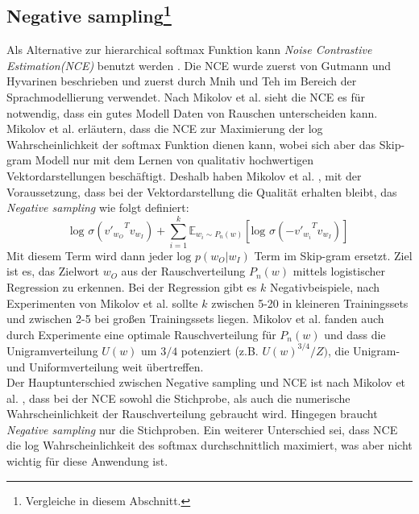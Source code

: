 \documentclass[12pt,a4paper]{report}
\begin{document}
\subsection*{Negative sampling\footnote{Vergleiche \cite{DBLP:journals/corr/MikolovSCCD13} in diesem Abschnitt.}}
Als Alternative zur hierarchical softmax Funktion kann \textit{Noise Contrastive Estimation(NCE)} benutzt werden \cite{DBLP:journals/corr/MikolovSCCD13}. Die NCE wurde zuerst von Gutmann und Hyvarinen \cite{gutmann2012noise} beschrieben und zuerst durch Mnih und Teh \cite{mnih2012fast} im Bereich der Sprachmodellierung verwendet. Nach Mikolov et al. \cite{DBLP:journals/corr/MikolovSCCD13} sieht die NCE es für notwendig, dass ein gutes Modell Daten von Rauschen unterscheiden kann. Mikolov et al. \cite{DBLP:journals/corr/MikolovSCCD13} erläutern, dass die NCE zur Maximierung der log Wahrscheinlichkeit der softmax Funktion dienen kann, wobei sich aber das Skip-gram Modell nur mit dem Lernen von qualitativ hochwertigen Vektordarstellungen beschäftigt. Deshalb haben Mikolov et al. \cite{DBLP:journals/corr/MikolovSCCD13}, mit der Voraussetzung, dass bei der Vektordarstellung die Qualität erhalten bleibt, das \textit{Negative sampling} wie folgt definiert:\\
\begin{equation}
\textrm{log }   \sigma({v'_{w_O}}^Tv_{w_I}) + \sum_{i=1}^k \mathbb{E}_{{w_i}\sim P_n(w)}\left[\textrm{log }\sigma({-v'_{w_i}}^Tv_{w_I})\right]
\end{equation}
Mit diesem Term wird dann jeder $\textrm{log }p(w_O|w_I)$ Term im Skip-gram ersetzt. Ziel ist es, das Zielwort $w_O$ aus der Rauschverteilung $P_n(w)$ mittels logistischer Regression zu erkennen\citep{DBLP:journals/corr/MikolovSCCD13}. Bei der Regression gibt es $k$ Negativbeispiele, nach Experimenten von Mikolov et al. \citep{DBLP:journals/corr/MikolovSCCD13} sollte $k$ zwischen 5-20 in kleineren Trainingssets und zwischen 2-5 bei großen Trainingssets liegen. Mikolov et al. \citep{DBLP:journals/corr/MikolovSCCD13} fanden auch durch Experimente eine optimale Rauschverteilung für $P_n(w)$ und dass die Unigramverteilung $U(w)$ um $3/4$ potenziert (z.B. ${U(w)}^{3/4} / Z)$, die Unigram- und Uniformverteilung weit übertreffen.\\
Der Hauptunterschied zwischen Negative sampling und NCE ist nach Mikolov et al. \citep{DBLP:journals/corr/MikolovSCCD13}, dass bei der NCE sowohl die Stichprobe, als auch die numerische Wahrscheinlichkeit der Rauschverteilung gebraucht wird. Hingegen braucht \textit{Negative sampling} nur die Stichproben. Ein weiterer Unterschied sei, dass NCE die log Wahrscheinlichkeit des softmax durchschnittlich maximiert, was aber nicht wichtig für diese Anwendung ist\citep{DBLP:journals/corr/MikolovSCCD13}.\\
\end{document}

